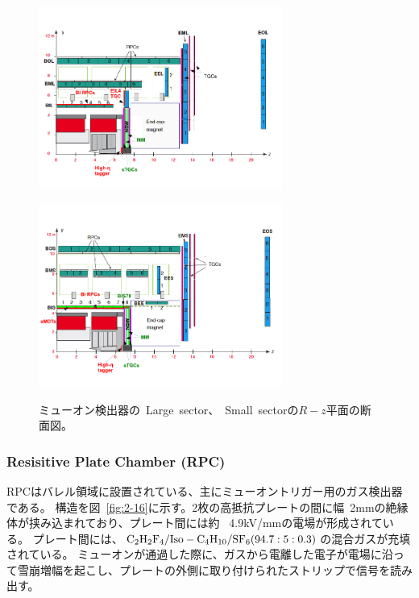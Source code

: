 
\begin{figure}[h]
  \begin{minipage}[b]{0.5\linewidth}
      \centering
      \includegraphics[clip, width=8cm]{fig/2/muon_Rz_Large.pdf}
      \label{fig:2-15-1}
  \end{minipage}
    \begin{minipage}[b]{0.5\linewidth}
      \centering
      \includegraphics[clip, width=8cm]{fig/2/muon_Rz_small.pdf}
      \label{fig:2-15-2}
  \end{minipage}
  \caption{ミューオン検出器の~Large~sector、~Small~sectorの$R-z$平面の断面図\cite{article:phase2}。}
\end{figure}

\subsubsection{Resisitive Plate Chamber (RPC)}
RPCはバレル領域に設置されている、主にミューオントリガー用のガス検出器である。
構造を図~\ref{fig:2-16}に示す。2枚の高抵抗プレートの間に幅~2mmの絶縁体が挟み込まれており、プレート間には約 ~4.9kV/mmの電場が形成されている。
プレート間には、$\rm{C_{2}H_{2}F_{4}/Iso - C_{4}H_{10}/SF_{6}(94.7 : 5 : 0.3)}$の混合ガスが充填されている。
ミューオンが通過した際に、ガスから電離した電子が電場に沿って雪崩増幅を起こし、プレートの外側に取り付けられたストリップで信号を読み出す。

